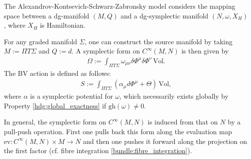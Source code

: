     \begin{example}
        The Alexandrov-Kontsevich-Schwarz-Zabronsky model considers the mapping space between a dg-manifold $(M,Q)$ and a dg-symplectic manifold $(N,\omega,X_H)$, where $X_H$ is Hamiltonian.

        For any graded manifold $\Sigma$, one can construct the source manifold by taking $M:=\Pi T\Sigma$ and $Q:=d$. A symplectic form on $C^\infty(M,N)$ is then given by
        \begin{gather}
            \Omega := \int_{\Pi T\Sigma}\omega_{\mu\nu}\delta\Phi^\mu\delta\Phi^\nu\,\mathrm{Vol}.
        \end{gather}
        The BV action is defined as follows:
        \begin{gather}
            S := \int_{\Pi T\Sigma}\left(\alpha_\mu d\Phi^\mu+\Theta\right)\,\mathrm{Vol},
        \end{gather}
        where $\alpha$ is a symplectic potential for $\omega$, which necessarily exists globally by Property \ref{hdg:global_exactness} if $\mathrm{gh}(\omega)\neq0$.

        In general, the symplectic form on $C^\infty(M,N)$ is induced from that on $N$ by a pull-push operation. First one pulls back this form along the evaluation map $\mathrm{ev}:C^\infty(M,N)\times M\rightarrow N$ and then one pushes it forward along the projection on the first factor (cf. fibre integration \ref{bundle:fibre_integration}).
    \end{example}